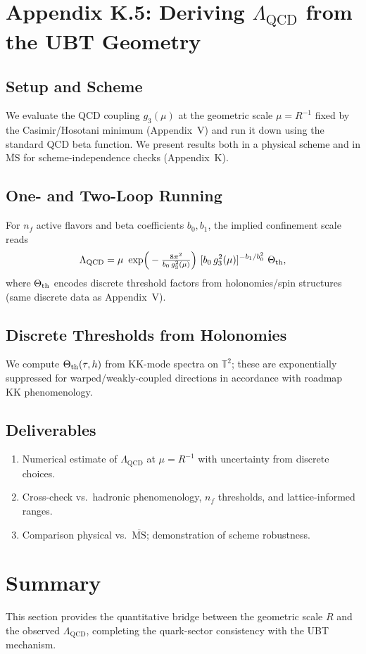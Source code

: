 \appendix
\section*{Appendix K.5: Deriving \texorpdfstring{$\Lambda_{\mathrm{QCD}}$}{Lambda\_QCD} from the UBT Geometry}

\subsection*{Setup and Scheme}
We evaluate the QCD coupling $g_3(\mu)$ at the geometric scale $\mu=R^{-1}$ fixed by the
Casimir/Hosotani minimum (Appendix~V) and run it down using the standard QCD beta function.
We present results both in a physical scheme and in $\overline{\mathrm{MS}}$ for scheme-independence checks (Appendix~K).

\subsection*{One- and Two-Loop Running}
For $n_f$ active flavors and beta coefficients $b_0,b_1$, the implied confinement scale reads
\begin{equation}
  \Lambda_{\mathrm{QCD}} = \mu \ \exp\!\Big(-\tfrac{8\pi^2}{b_0\,g_3^2(\mu)}\Big)\ [b_0\,g_3^2(\mu)]^{-b_1/b_0^2}\ \Theta_{\rm th} ,
  \label{eq:K5_lambdaQCD}
\end{equation}
where $\Theta_{\rm th}$ encodes discrete threshold factors from holonomies/spin structures (same discrete data as Appendix~V).

\subsection*{Discrete Thresholds from Holonomies}
We compute $\Theta_{\rm th}(\tau,h)$ from KK-mode spectra on $\mathbb{T}^2$;
these are exponentially suppressed for warped/weakly-coupled directions in accordance with roadmap KK phenomenology.

\subsection*{Deliverables}
\begin{enumerate}
  \item Numerical estimate of $\Lambda_{\mathrm{QCD}}$ at $\mu=R^{-1}$ with uncertainty from discrete choices.
  \item Cross-check vs.\ hadronic phenomenology, $n_f$ thresholds, and lattice-informed ranges.
  \item Comparison physical vs.\ $\overline{\mathrm{MS}}$; demonstration of scheme robustness.
\end{enumerate}

\section*{Summary}
This section provides the quantitative bridge between the geometric scale $R$ and the observed $\Lambda_{\mathrm{QCD}}$,
completing the quark-sector consistency with the UBT mechanism.
